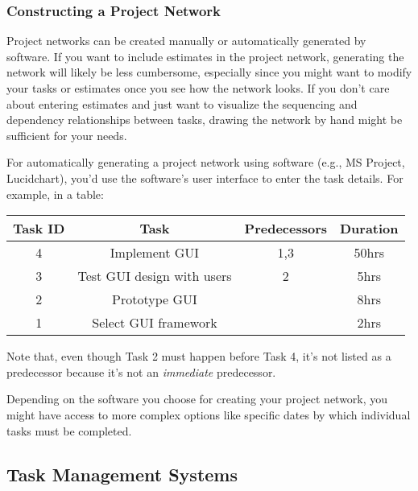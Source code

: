 \subsubsection{Constructing a Project Network}

Project networks can be created manually or automatically generated by software. If you want to include estimates in the project network, generating the network will likely be less cumbersome, especially since you might want to modify your tasks or estimates once you see how the network looks. If you don't care about entering estimates and just want to visualize the sequencing and dependency relationships between tasks, drawing the network by hand might be sufficient for your needs.

For automatically generating a project network using software (e.g., MS Project, Lucidchart), you'd use the software's user interface to enter the task details. For example, in a table:

\begin{center}
\begin{tabular}{c|c|c|c}
\rowcolor{light-gray}
Task ID & Task & Predecessors\index{predecessor}\index{task predecessor} & Duration \\
\hline
4 & Implement GUI & 1,3 & 50hrs \\
\hline
3 & Test GUI design with users & 2 & 5hrs \\
\hline
2 & Prototype GUI & & 8hrs \\
\hline
1 & Select GUI framework & & 2hrs \\
\end{tabular}
\end{center}

Note that, even though Task 2 must happen before Task 4, it's not listed as a predecessor because it's not an \textit{immediate} predecessor.

Depending on the software you choose for creating your project network, you might have access to more complex options like specific dates by which individual tasks must be completed.

\subsection{Task Management Systems}

